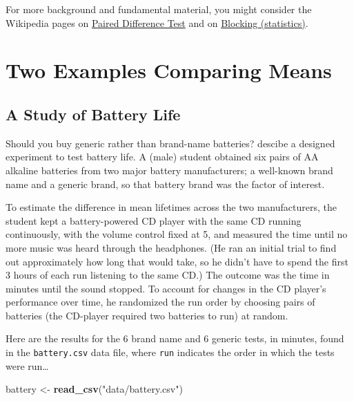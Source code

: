 \documentclass[
]{book}
\newenvironment{Shaded}{\begin{snugshade}}{\end{snugshade}}
\newcommand{\KeywordTok}[1]{\textcolor[rgb]{0.13,0.29,0.53}{\textbf{#1}}}
\newcommand{\NormalTok}[1]{#1}
\newcommand{\StringTok}[1]{\textcolor[rgb]{0.31,0.60,0.02}{#1}}
\begin{document}
For more background and fundamental material, you might consider the Wikipedia pages on \href{https://en.wikipedia.org/wiki/Paired_difference_test}{Paired Difference Test} and on \href{https://en.wikipedia.org/wiki/Blocking_(statistics)}{Blocking (statistics)}.

\hypertarget{two-examples-comparing-means}{%
\chapter{Two Examples Comparing Means}\label{two-examples-comparing-means}}

\hypertarget{a-study-of-battery-life}{%
\section{A Study of Battery Life}\label{a-study-of-battery-life}}

Should you buy generic rather than brand-name batteries? \citet{BockVD} descibe a designed experiment to test battery life. A (male) student obtained six pairs of AA alkaline batteries from two major battery manufacturers; a well-known brand name and a generic brand, so that battery brand was the factor of interest.

To estimate the difference in mean lifetimes across the two manufacturers, the student kept a battery-powered CD player with the same CD running continuously, with the volume control fixed at 5, and measured the time until no more music was heard through the headphones. (He ran an initial trial to find out approximately how long that would take, so he didn't have to spend the first 3 hours of each run listening to the same CD.) The outcome was the time in minutes until the sound stopped. To account for changes in the CD player's performance over time, he randomized the run order by choosing pairs of batteries (the CD-player required two batteries to run) at random.

Here are the results for the 6 brand name and 6 generic tests, in minutes, found in the \texttt{battery.csv} data file, where \texttt{run} indicates the order in which the tests were run\ldots{}

\begin{Shaded}
\begin{Highlighting}[]
\NormalTok{battery <-}\StringTok{ }\KeywordTok{read_csv}\NormalTok{(}\StringTok{"data/battery.csv"}\NormalTok{)}
\end{Highlighting}
\end{Shaded}
\end{document}
